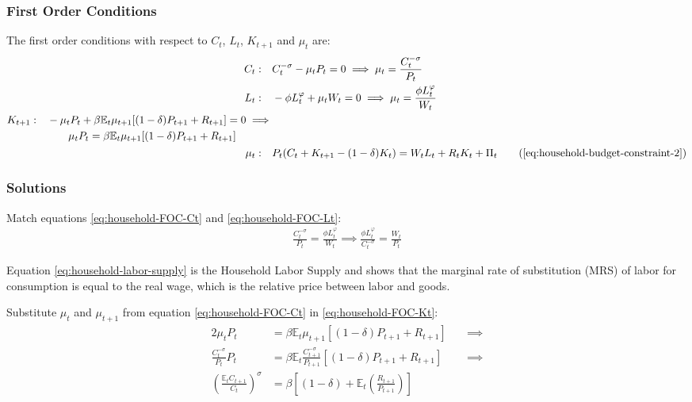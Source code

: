 \documentclass[
	12pt,
	]{article}
\numberwithin{equation}{section}
\theoremstyle{definition}
\theoremstyle{plain}
\theoremstyle{plain}
\theoremstyle{plain}
\begin{document}
\subsubsection*{First Order Conditions}

The first order conditions with respect to $C_t$, $L_t$, $K_{t+1}$ and $\mu_t$ are:
\begin{align}
	C_t: \quad & C_t^{-\sigma} -\mu_t P_t = 0 \implies \mu_t = \frac{C_t^{-\sigma}}{P_t} \label{eq:household-FOC-Ct} \\
	L_t: \quad & -\phi L_t^{\varphi} +\mu_t W_t = 0 \implies \mu_t = \frac{\phi L_t^{\varphi}}{W_t} \label{eq:household-FOC-Lt} \\
	\begin{split}
		K_{t+1}: \quad & -\mu_t P_t +\beta \mathbb{E}_t \mu_{t+1} [(1-\delta) P_{t+1} + R_{t+1}] = 0 \implies \\ & \qquad \mu_t P_t = \beta \mathbb{E}_t \mu_{t+1} [(1-\delta) P_{t+1} + R_{t+1}]
	\end{split} \label{eq:household-FOC-Kt} \\
	\mu_t: \quad & P_t (C_t + K_{t+1} - (1-\delta)K_t) = W_t L_t + R_t K_t + \Pi_t \tag{\ref{eq:household-budget-constraint-2}}
\end{align}

\subsubsection*{Solutions}

Match equations \ref{eq:household-FOC-Ct} and \ref{eq:household-FOC-Lt}:
\begin{align}
\label{eq:household-labor-supply}
	\frac{C_t^{-\sigma}}{P_t} = \frac{\phi L_t^{\varphi}}{W_t} \implies 
	\frac{\phi L_t^{\varphi}}{C_t^{-\sigma}} = \frac{W_t}{P_t}
\end{align}

Equation \ref{eq:household-labor-supply} is the Household Labor Supply and shows that the marginal rate of substitution (MRS) of labor for consumption is equal to the real wage, which is the relative price between labor and goods.

Substitute $\mu_t$ and $\mu_{t+1}$ from equation \ref{eq:household-FOC-Ct} in \ref{eq:household-FOC-Kt}:
\begin{alignat}{2}
	\mu_t P_t & = \beta \mathbb{E}_t \mu_{t+1} [(1-\delta) P_{t+1} + R_{t+1}] \quad &\implies \nonumber \\
	\frac{C_t^{-\sigma}}{P_t} P_t & = \beta \mathbb{E}_t \frac{C_{t+1}^{-\sigma}}{P_{t+1}} [(1-\delta) P_{t+1} + R_{t+1}] &\implies \nonumber \\
	\left( \frac{\mathbb{E}_t C_{t+1}}{C_t} \right)^\sigma & = \beta \left[ (1-\delta) + \mathbb{E}_t \left(\frac{R_{t+1}}{P_{t+1}}\right) \right] \label{eq:household-euler-equation}
\end{alignat}
\end{document}
